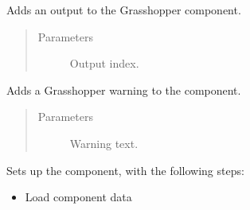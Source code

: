\documentclass[letterpaper,10pt,english]{sphinxmanual}
\begin{document}
\begin{fulllineitems}
\begin{fulllineitems}
\begin{quote}
\begin{description}
\end{description}\end{quote}

\end{fulllineitems}


\begin{fulllineitems}
\label{\detokenize{superclass:livestock.components.component.GHComponent.add_output_parameter}}
Adds an output to the Grasshopper component.
\begin{quote}\begin{description}
\item[{Parameters}] \leavevmode
{} \textendash{} Output index.

\end{description}\end{quote}

\end{fulllineitems}


\begin{fulllineitems}
\label{\detokenize{superclass:livestock.components.component.GHComponent.add_warning}}
Adds a Grasshopper warning to the component.
\begin{quote}\begin{description}
\item[{Parameters}] \leavevmode
{} \textendash{} Warning text.

\end{description}\end{quote}

\end{fulllineitems}


\begin{fulllineitems}
\label{\detokenize{superclass:livestock.components.component.GHComponent.config_component}}
Sets up the component, with the following steps:
\begin{itemize}
\item {} 
Load component data


\end{itemize}
\end{fulllineitems}
\end{fulllineitems}
\end{document}
